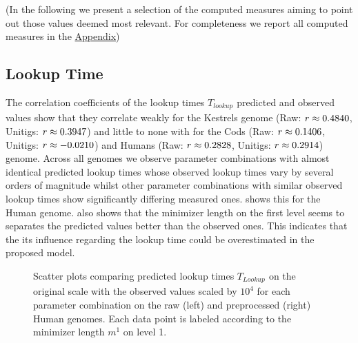 \documentclass[a4paper,titlepage,onecolumn,oneside,12pt,nenglish,titlepage=firstiscover]{scrbook}
\theoremstyle{plain} %
\theoremstyle{definition} %
\theoremstyle{remark} %
\theoremstyle{plain}
\newcommand{\minimizerLength}{m}
\newcommand{\timeForOperationOnStructure}[2]{T_{#1_{#2}}} %
\begin{document}
(In the following we present a selection of the computed measures aiming to point out those values deemed most relevant. For completeness we report all computed measures in the \textcolor{red}{\hyperref[appendix]{Appendix}})
\begin{table}[h]
	\centering
	
	\caption{Statistical evaluation of the variables modeling total bits per $k$-mer $bpk_{total}$ and lookup time $\timeForOperationOnStructure{lookup}{}$. The tables show the predicted values $Pred$ compared against the observed ones $Obs$. All values have been rounded to four significant figures.} 
	\label{tab:modelErrorOverview}
\end{table}

\subsection{Lookup Time}
The correlation coefficients of the lookup times $\timeForOperationOnStructure{lookup}{}$ predicted and observed values show that they correlate weakly for the Kestrels genome (Raw: $r \approx 0.4840$, Unitigs: $r \approx 0.3947$) and little to none with for the Cods (Raw: $r \approx 0.1406$, Unitigs: $r \approx -0.0210$) and Humans (Raw: $r \approx 0.2828$, Unitigs: $r \approx 0.2914$) genome. 
Across all genomes we observe parameter combinations with almost identical predicted lookup times whose observed lookup times vary by several orders of magnitude whilst other parameter combinations with similar observed lookup times show significantly differing measured ones.  shows this for the Human genome.  also shows that the minimizer length on the first level seems to separates the predicted values better than the observed ones. This indicates that the its influence regarding the lookup time could be overestimated in the proposed model.\\
\begin{figure}[h]
	\centering
	
	\caption{Scatter plots comparing predicted lookup times $\timeForOperationOnStructure{Lookup}{}$ on the original scale with the observed values scaled by $10^4$ for each parameter combination on the raw (left) and preprocessed (right) Human genomes. Each data point is labeled according to the minimizer length $\minimizerLength^1$ on level 1.} \label{fig:lookupTimePlot}
\end{figure}
\end{document}
